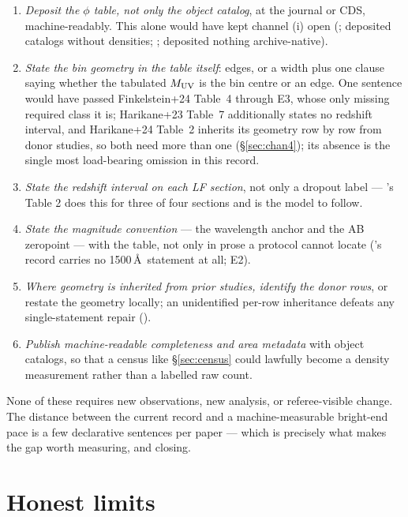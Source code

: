 \documentclass[twocolumn]{aastex702}
\begin{document}
\begin{enumerate}
\item \emph{Deposit the $\phi$ table, not only the object catalog}, at the journal or
CDS, machine-readably. This alone would have kept channel (i) open
(\citealt{bouwens21}; \citealt{finkelstein15} deposited catalogs without densities;
\citealt{harikane23}; \citealt{donnan23} deposited nothing archive-native).
\item \emph{State the bin geometry in the table itself}: edges, or a width plus one
clause saying whether the tabulated $M_{\rm UV}$ is the bin centre or an edge. One
sentence would have passed Finkelstein+24 Table~4 through E3, whose only missing required
class it is; Harikane+23 Table~7 additionally states no redshift interval, and Harikane+24
Table~2 inherits its geometry row by row from donor studies, so both need more than one
(\S\ref{sec:chan4}); its absence is the single most load-bearing omission in this
record.
\item \emph{State the redshift interval on each LF section}, not only a dropout label
--- \citet{harikane24}'s Table 2 does this for three of four sections and is the model
to follow.
\item \emph{State the magnitude convention} --- the wavelength anchor and the AB
zeropoint --- with the table, not only in prose a protocol cannot locate
(\citealt{weibel26}'s record carries no 1500\,\AA\ statement at all; E2).
\item \emph{Where geometry is inherited from prior studies, identify the donor rows},
or restate the geometry locally; an unidentified per-row inheritance defeats any
single-statement repair (\citealt{harikane24}).
\item \emph{Publish machine-readable completeness and area metadata} with object
catalogs, so that a census like \S\ref{sec:census} could lawfully become a density
measurement rather than a labelled raw count.
\end{enumerate}

None of these requires new observations, new analysis, or referee-visible change. The
distance between the current record and a machine-measurable bright-end pace is a few
declarative sentences per paper --- which is precisely what makes the gap worth
measuring, and closing.

\section{Honest limits} \label{sec:limits}
\end{document}
